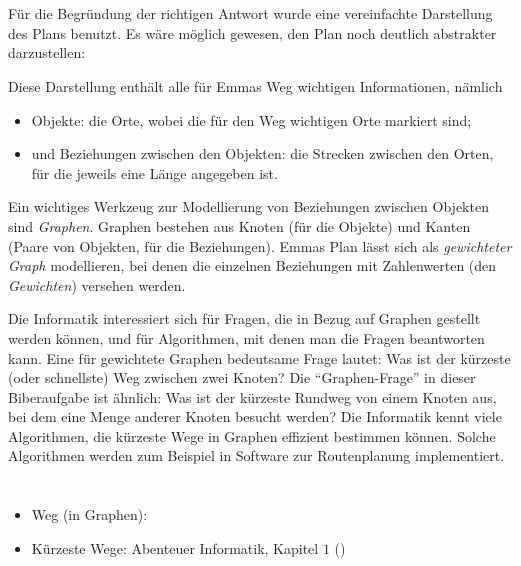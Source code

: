 {{%
\section*{\BrochureItsInformatics}
Für die Begründung der richtigen Antwort wurde eine vereinfachte Darstellung des Plans benutzt.
Es wäre möglich gewesen, den Plan noch deutlich abstrakter darzustellen:

{\centering%
\par}

Diese Darstellung enthält alle für Emmas Weg wichtigen Informationen, nämlich

\begin{itemize}
  \item Objekte: die Orte, wobei die für den Weg wichtigen Orte markiert sind;
  \item und Beziehungen zwischen den Objekten: die Strecken zwischen den Orten, für die jeweils eine Länge angegeben ist.
\end{itemize}

Ein wichtiges Werkzeug zur Modellierung von Beziehungen zwischen Objekten sind \emph{Graphen}.
Graphen bestehen aus Knoten (für die Objekte) und Kanten (Paare von Objekten, für die Beziehungen).
Emmas Plan lässt sich als \emph{gewichteter Graph} modellieren,
bei denen die einzelnen Beziehungen mit Zahlenwerten (den \emph{Gewichten}) versehen werden.

Die Informatik interessiert sich für Fragen, die in Bezug auf Graphen gestellt werden können,
und für Algorithmen, mit denen man die Fragen beantworten kann.
Eine für gewichtete Graphen bedeutsame Frage lautet:
Was ist der kürzeste (oder schnellste) Weg zwischen zwei Knoten?
Die \enquote{Graphen-Frage} in dieser Biberaufgabe ist ähnlich:
Was ist der kürzeste Rundweg von einem Knoten aus, bei dem eine Menge anderer Knoten besucht werden?
Die Informatik kennt viele Algorithmen, die kürzeste Wege in Graphen effizient bestimmen können.
Solche Algorithmen werden zum Beispiel in Software zur Routenplanung implementiert.



\section*{\BrochureWebsitesAndKeywords}
{\raggedright
\begin{itemize}
  \item Weg (in Graphen): \href{https://de.wikipedia.org/wiki/Weg_(Graphentheorie)}{}
  \item Kürzeste Wege:  Abenteuer Informatik, Kapitel $1$  (\href{http://abenteuer-informatik.de/dasbuch.html}{})
\end{itemize}


}}}
